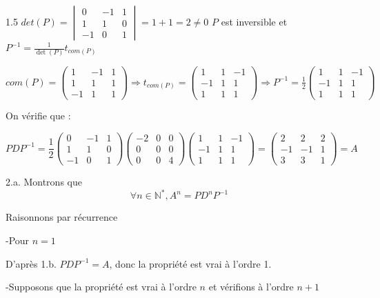 \documentclass[12pt]{article}
\begin{document}
\begin{spacing}{1.5}
$det(P)=\begin{vmatrix}
0  & -1 & 1 \\ 
1  & 1  & 0 \\ 
-1 & 0  & 1
\end{vmatrix} = 1+1=2\neq 0$ $P$ est inversible et $P^{-1}=\frac{1}{\det(P)}t_{com(P)}$

$com(P)=\begin{pmatrix}
1  & -1 & 1 \\ 
1  & 1  & 1 \\ 
-1 & 1  & 1
\end{pmatrix}\Rightarrow t_{com(P)}=\begin{pmatrix}
1  & 1 & -1 \\ 
-1  & 1  & 1 \\ 
1 & 1  & 1
\end{pmatrix} \Rightarrow P^{-1}=\frac{1}{2} \begin{pmatrix}
1  & 1 & -1 \\ 
-1  & 1  & 1 \\ 
1 & 1  & 1
\end{pmatrix}$

On vérifie que :

\[PDP^{-1}=\frac{1}{2}\begin{pmatrix}
0  & -1 & 1 \\ 
1  & 1  & 0 \\ 
-1 & 0  & 1
\end{pmatrix}\begin{pmatrix}
-2 & 0& 0 \\ 
0 & 0 & 0 \\ 
0 & 0 & 4
\end{pmatrix}\begin{pmatrix}
1  & 1 & -1 \\ 
-1  & 1  & 1 \\ 
1 & 1  & 1
\end{pmatrix}=\begin{pmatrix}
2 & 2& 2 \\ 
-1 & -1 & 1 \\ 
3 & 3 & 1
\end{pmatrix}=A\]

2.a. Montrons que 
\[
\forall {n\in\mathbb{N}^*}, A^n = PD^nP^{-1}
\]

Raisonnons par récurrence

-Pour $n=1$

D'après 1.b. $PDP^{-1}=A$, donc la propriété est vrai à l'ordre 1.

-Supposons que la propriété est vrai à l'ordre $n$ et vérifions à l'ordre $n+1$


\end{spacing}
\end{document}
